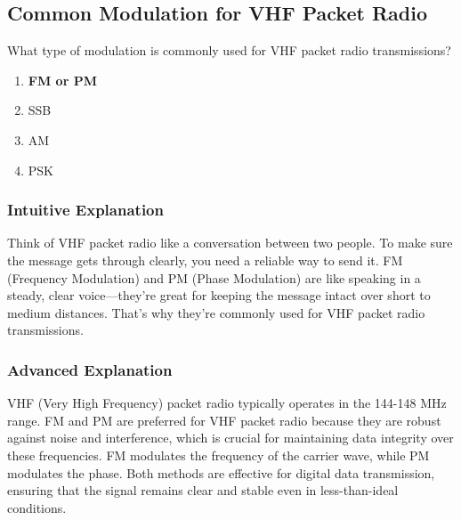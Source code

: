 \subsection{Common Modulation for VHF Packet Radio}
\label{T8A02}

\begin{tcolorbox}[colback=gray!10!white,colframe=black!75!black,title=T8A02]
What type of modulation is commonly used for VHF packet radio transmissions?
\begin{enumerate}[noitemsep]
    \item \textbf{FM or PM}
    \item SSB
    \item AM
    \item PSK
\end{enumerate}
\end{tcolorbox}

\subsubsection*{Intuitive Explanation}
Think of VHF packet radio like a conversation between two people. To make sure the message gets through clearly, you need a reliable way to send it. FM (Frequency Modulation) and PM (Phase Modulation) are like speaking in a steady, clear voice—they’re great for keeping the message intact over short to medium distances. That’s why they’re commonly used for VHF packet radio transmissions.

\subsubsection*{Advanced Explanation}
VHF (Very High Frequency) packet radio typically operates in the 144-148 MHz range. FM and PM are preferred for VHF packet radio because they are robust against noise and interference, which is crucial for maintaining data integrity over these frequencies. FM modulates the frequency of the carrier wave, while PM modulates the phase. Both methods are effective for digital data transmission, ensuring that the signal remains clear and stable even in less-than-ideal conditions.